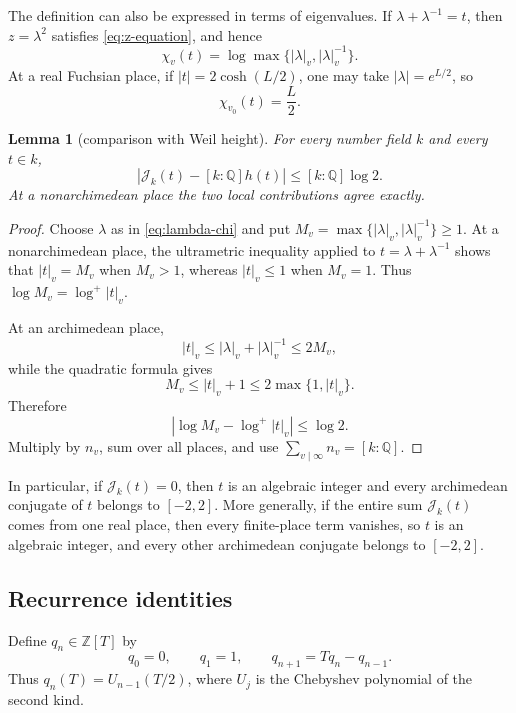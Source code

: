 \documentclass[11pt,reqno]{amsart}
\newtheorem{lemma}[theorem]{Lemma}
\theoremstyle{definition}
\theoremstyle{remark}
\newcommand{\Q}{\mathbb Q}
\newcommand{\Z}{\mathbb Z}
\newcommand{\cJ}{\mathcal J}
\begin{document}
The definition can also be expressed in terms of eigenvalues.  If
\(\lambda+\lambda^{-1}=t\),
then \(z=\lambda^2\) satisfies \eqref{eq:z-equation}, and hence
\begin{equation}\label{eq:lambda-chi}
 \chi_v(t)=\log\max\{|\lambda|_v,|\lambda|_v^{-1}\}.
\end{equation}
At a real Fuchsian place, if \(|t|=2\cosh(L/2)\), one may take
\(|\lambda|=e^{L/2}\), so
\begin{equation}\label{eq:distinguished-contribution}
 \chi_{v_0}(t)=\frac L2.
\end{equation}

\begin{lemma}[comparison with Weil height]
\label{lem:J-height-comparison}
For every number field \(k\) and every \(t\in k\),
\begin{equation}\label{eq:J-height-comparison}
 \left|\cJ_k(t)-[k:\Q]h(t)\right|
 \le [k:\Q]\log2.
\end{equation}
At a nonarchimedean place the two local contributions agree exactly.
\end{lemma}

\begin{proof}
Choose \(\lambda\) as in \eqref{eq:lambda-chi} and put
\(M_v=\max\{|\lambda|_v,|\lambda|_v^{-1}\}\ge1\).  At a
nonarchimedean place, the ultrametric inequality applied to
\(t=\lambda+\lambda^{-1}\) shows that \(|t|_v=M_v\) when \(M_v>1\),
whereas \(|t|_v\le1\) when \(M_v=1\).  Thus
\(\log M_v=\log^+|t|_v\).

At an archimedean place,
\[
 |t|_v\le |\lambda|_v+|\lambda|_v^{-1}\le2M_v,
\]
while the quadratic formula gives
\[
 M_v\le |t|_v+1\le2\max\{1,|t|_v\}.
\]
Therefore
\[
 \left|\log M_v-\log^+|t|_v\right|\le\log2.
\]
Multiply by \(n_v\), sum over all places, and use
\(\sum_{v\mid\infty}n_v=[k:\Q]\).
\end{proof}

In particular, if \(\cJ_k(t)=0\), then \(t\) is an algebraic integer and
every archimedean conjugate of \(t\) belongs to \([-2,2]\).  More
generally, if the entire sum \(\cJ_k(t)\) comes from one real place, then
every finite-place term vanishes, so \(t\) is an algebraic integer, and every
other archimedean conjugate belongs to \([-2,2]\).

\subsection{Recurrence identities}

Define \(q_n\in\Z[T]\) by
\begin{equation}\label{eq:q-recurrence}
 q_0=0,\qquad q_1=1,\qquad q_{n+1}=Tq_n-q_{n-1}.
\end{equation}
Thus \(q_n(T)=U_{n-1}(T/2)\), where \(U_j\) is the Chebyshev polynomial of
the second kind.
\end{document}
